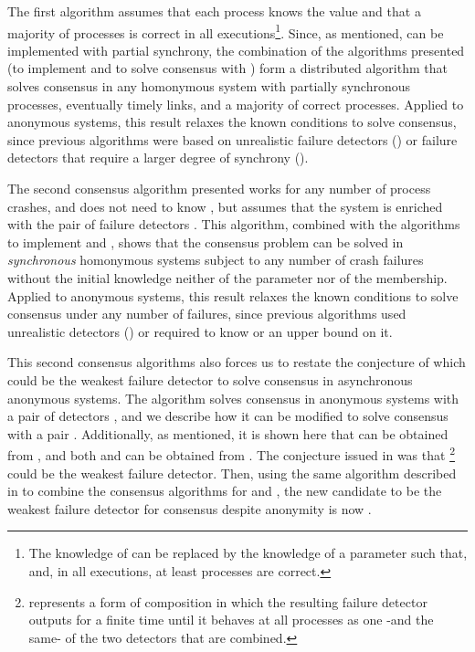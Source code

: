 \documentclass[10pt, conference, compsocconf]{IEEEtran}
\begin{document}
The first algorithm assumes that each process knows the value 
and that a majority of processes is correct in 
all executions\footnote{The knowledge of  can be replaced 
by the knowledge of a
parameter  such that,  and, in all executions, 
at least  processes are correct.}. Since, as mentioned,
 can be implemented with partial synchrony, the combination of the
algorithms presented (to implement  and to solve consensus with )
form a distributed algorithm that solves consensus in any homonymous system
with partially synchronous processes, eventually timely  links, and 
a majority of correct processes. Applied to anonymous systems,
this result relaxes the known conditions to solve consensus, since previous
algorithms were based on unrealistic failure 
detectors () or failure  detectors that require
a larger degree of synchrony ().

The second consensus algorithm presented works for any number of process 
crashes, and does not need to know , but assumes that 
the system is  enriched with the pair of failure detectors 
.
This algorithm, combined with the algorithms to implement 
 and , shows that the consensus problem 
can be solved in \emph{synchronous} homonymous systems subject to
any number of crash failures without the initial knowledge neither of 
the parameter   nor  of the membership.
Applied to anonymous systems, this result relaxes the known conditions to 
solve consensus under any number of failures, 
since previous algorithms used unrealistic detectors
() or required to know  or an upper bound on it.



This second consensus algorithms also forces us to restate 
the conjecture of which could be the weakest failure detector to solve
consensus in asynchronous anonymous systems. The algorithm solves 
consensus in anonymous systems with a pair of detectors 
,
and we describe how it can be modified to solve consensus 
with a pair . Additionally, as mentioned,
it is shown here that  can be obtained from , and both
 and  can be obtained from . 
The conjecture issued in \cite{DBLP:conf/wdag/BonnetR10} was that
 \footnote{ represents 
a form of composition in which the resulting failure detector 
outputs  for a finite time until it behaves at all processes 
as  one -and the same- of the two detectors  that are combined.} 
could be the weakest failure detector. 
Then, using the same algorithm described in \cite{DBLP:conf/wdag/BonnetR10} 
to combine the
consensus algorithms for  and  
, the new candidate  to be the 
 weakest failure detector for consensus despite anonymity is  now 
.
\end{document}
